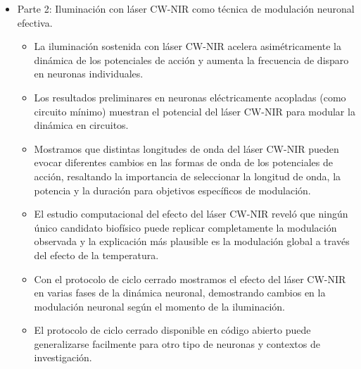 \begin{itemize}
	\item Parte 2: Iluminación con láser CW-NIR como técnica de modulación neuronal efectiva.
	\begin{itemize}
		\item La iluminación sostenida con láser CW-NIR acelera asimétricamente la dinámica de los potenciales de acción y aumenta la frecuencia de disparo en neuronas individuales.
		\item Los resultados preliminares en neuronas eléctricamente acopladas (como circuito mínimo) muestran el potencial del láser CW-NIR para modular la dinámica en circuitos.
		\item Mostramos que distintas longitudes de onda del láser CW-NIR pueden evocar diferentes cambios en las formas de onda de los potenciales de acción, resaltando la importancia de seleccionar la longitud de onda, la potencia y la duración para objetivos específicos de modulación.
		\item    El estudio computacional del efecto del láser CW-NIR reveló que ningún único candidato biofísico puede replicar completamente la modulación observada y la explicación más plausible es la modulación global a través del efecto de la temperatura.
		\item Con el protocolo de ciclo cerrado mostramos el efecto del láser CW-NIR en varias fases de la dinámica neuronal, demostrando cambios en la modulación neuronal según el momento de la iluminación.
		\item El protocolo de ciclo cerrado disponible en código abierto puede generalizarse facilmente para otro tipo de neuronas y contextos de investigación.
	\end{itemize}
	
\end{itemize}

